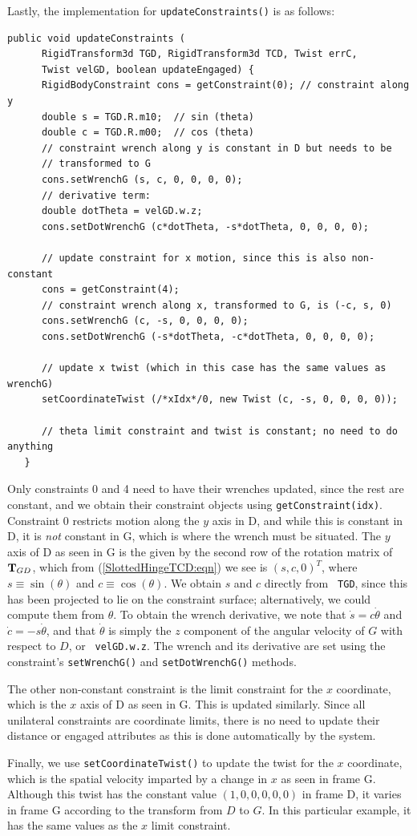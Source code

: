 Lastly, the implementation for {\tt updateConstraints()} is as
follows:
%
\begin{lstlisting}[]
   public void updateConstraints (
      RigidTransform3d TGD, RigidTransform3d TCD, Twist errC,
      Twist velGD, boolean updateEngaged) {
      RigidBodyConstraint cons = getConstraint(0); // constraint along y
      double s = TGD.R.m10;  // sin (theta)
      double c = TGD.R.m00;  // cos (theta)
      // constraint wrench along y is constant in D but needs to be
      // transformed to G
      cons.setWrenchG (s, c, 0, 0, 0, 0);
      // derivative term:
      double dotTheta = velGD.w.z;
      cons.setDotWrenchG (c*dotTheta, -s*dotTheta, 0, 0, 0, 0);
      
      // update constraint for x motion, since this is also non-constant
      cons = getConstraint(4);
      // constraint wrench along x, transformed to G, is (-c, s, 0)
      cons.setWrenchG (c, -s, 0, 0, 0, 0);
      cons.setDotWrenchG (-s*dotTheta, -c*dotTheta, 0, 0, 0, 0);

      // update x twist (which in this case has the same values as wrenchG)
      setCoordinateTwist (/*xIdx*/0, new Twist (c, -s, 0, 0, 0, 0));

      // theta limit constraint and twist is constant; no need to do anything
   }
\end{lstlisting}
%
Only constraints 0 and 4 need to have their wrenches updated, since
the rest are constant, and we obtain their constraint objects using
{\tt getConstraint(idx)}. Constraint 0 restricts motion along the $y$
axis in D, and while this is constant in D, it is {\it not} constant
in G, which is where the wrench must be situated. The $y$ axis of D
as seen in G is the given by the second row of the rotation matrix of
${\bf T}_{GD}$, which from (\ref{SlottedHingeTCD:eqn}) we see is
$(s, c, 0)^T$, where $s \equiv \sin(\theta)$ and
$c \equiv \cos(\theta)$.  We obtain $s$ and $c$ directly from {\tt
TGD}, since this has been projected to lie on the constraint surface;
alternatively, we could compute them from $\theta$. To obtain the
wrench derivative, we note that $\dot s = c \dot\theta$ and
$\dot c = -s \dot\theta$, and that $\dot\theta$ is simply the $z$
component of the angular velocity of $G$ with respect to $D$, or {\tt
velGD.w.z}. The wrench and its derivative are set using the
constraint's {\tt setWrenchG()} and {\tt setDotWrenchG()} methods.

The other non-constant constraint is the limit constraint for the $x$
coordinate, which is the $x$ axis of D as seen in G. This is updated
similarly. Since all unilateral constraints are coordinate limits, there is no
need to update their {\sf distance} or {\sf engaged} attributes as this is done
automatically by the system.

Finally, we use {\tt setCoordinateTwist()} to update the twist for the $x$
coordinate, which is the spatial velocity imparted by a change in $x$ as seen
in frame G. Although this twist has the constant value $(1, 0, 0, 0, 0, 0)$ in
frame D, it varies in frame G according to the transform from $D$ to $G$.  In
this particular example, it has the same values as the $x$ limit constraint.

\ifdefined\maindoc
\else

\fi
